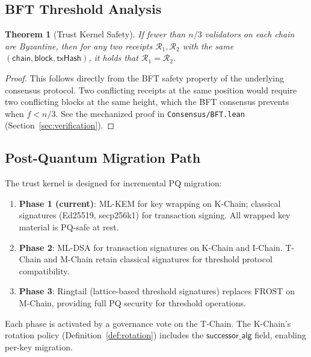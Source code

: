 \documentclass[11pt,a4paper]{article}
\newtheorem{theorem}{Theorem}[section]
\begin{document}
\subsection{BFT Threshold Analysis}

\begin{theorem}[Trust Kernel Safety]\label{thm:safety}
If fewer than $n/3$ validators on each chain are Byzantine, then for any
two receipts $\mathcal{R}_1, \mathcal{R}_2$ with the same
$(\mathsf{chain}, \mathsf{block}, \mathsf{txHash})$, it holds that
$\mathcal{R}_1 = \mathcal{R}_2$.
\end{theorem}

\begin{proof}
This follows directly from the BFT safety property of the underlying consensus
protocol. Two conflicting receipts at the same position would require two
conflicting blocks at the same height, which the BFT consensus prevents
when $f < n/3$. See the mechanized proof in \texttt{Consensus/BFT.lean}
(Section~\ref{sec:verification}).
\end{proof}

\subsection{Post-Quantum Migration Path}

The trust kernel is designed for incremental PQ migration:

\begin{enumerate}
    \item \textbf{Phase 1 (current)}: ML-KEM for key wrapping on K-Chain;
          classical signatures (Ed25519, secp256k1) for transaction signing.
          All wrapped key material is PQ-safe at rest.
    \item \textbf{Phase 2}: ML-DSA for transaction signatures on K-Chain and
          I-Chain. T-Chain and M-Chain retain classical signatures for
          threshold protocol compatibility.
    \item \textbf{Phase 3}: Ringtail (lattice-based threshold signatures)
          replaces FROST on M-Chain, providing full PQ security for threshold
          operations.
\end{enumerate}

Each phase is activated by a governance vote on the T-Chain. The K-Chain's
rotation policy (Definition~\ref{def:rotation}) includes the
$\mathsf{successor\_alg}$ field, enabling per-key migration.

\end{document}
